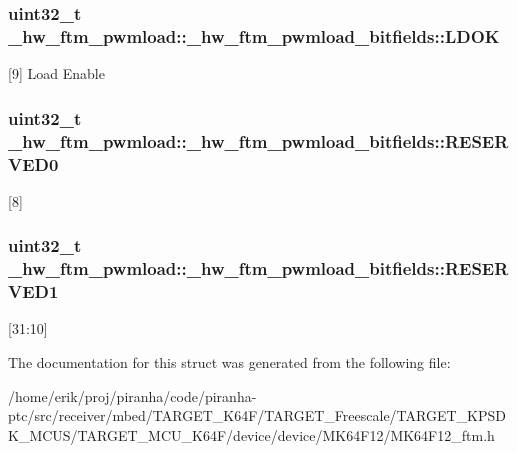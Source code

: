 \subsubsection[{\texorpdfstring{L\+D\+OK}{LDOK}}]{\setlength{\rightskip}{0pt plus 5cm}uint32\+\_\+t \+\_\+hw\+\_\+ftm\+\_\+pwmload\+::\+\_\+hw\+\_\+ftm\+\_\+pwmload\+\_\+bitfields\+::\+L\+D\+OK}\hypertarget{struct__hw__ftm__pwmload_1_1__hw__ftm__pwmload__bitfields_a13b04d6840087207cdf0e60ef3ca5700}{}\label{struct__hw__ftm__pwmload_1_1__hw__ftm__pwmload__bitfields_a13b04d6840087207cdf0e60ef3ca5700}
\mbox{[}9\mbox{]} Load Enable 
\subsubsection[{\texorpdfstring{R\+E\+S\+E\+R\+V\+E\+D0}{RESERVED0}}]{\setlength{\rightskip}{0pt plus 5cm}uint32\+\_\+t \+\_\+hw\+\_\+ftm\+\_\+pwmload\+::\+\_\+hw\+\_\+ftm\+\_\+pwmload\+\_\+bitfields\+::\+R\+E\+S\+E\+R\+V\+E\+D0}\hypertarget{struct__hw__ftm__pwmload_1_1__hw__ftm__pwmload__bitfields_ab28058e83a7216ff12414fef308c0da1}{}\label{struct__hw__ftm__pwmload_1_1__hw__ftm__pwmload__bitfields_ab28058e83a7216ff12414fef308c0da1}
\mbox{[}8\mbox{]} 
\subsubsection[{\texorpdfstring{R\+E\+S\+E\+R\+V\+E\+D1}{RESERVED1}}]{\setlength{\rightskip}{0pt plus 5cm}uint32\+\_\+t \+\_\+hw\+\_\+ftm\+\_\+pwmload\+::\+\_\+hw\+\_\+ftm\+\_\+pwmload\+\_\+bitfields\+::\+R\+E\+S\+E\+R\+V\+E\+D1}\hypertarget{struct__hw__ftm__pwmload_1_1__hw__ftm__pwmload__bitfields_af413226bc6202ec273c9a66e6910367a}{}\label{struct__hw__ftm__pwmload_1_1__hw__ftm__pwmload__bitfields_af413226bc6202ec273c9a66e6910367a}
\mbox{[}31\+:10\mbox{]} 

The documentation for this struct was generated from the following file\+:\begin{DoxyCompactItemize}
\item 
/home/erik/proj/piranha/code/piranha-\/ptc/src/receiver/mbed/\+T\+A\+R\+G\+E\+T\+\_\+\+K64\+F/\+T\+A\+R\+G\+E\+T\+\_\+\+Freescale/\+T\+A\+R\+G\+E\+T\+\_\+\+K\+P\+S\+D\+K\+\_\+\+M\+C\+U\+S/\+T\+A\+R\+G\+E\+T\+\_\+\+M\+C\+U\+\_\+\+K64\+F/device/device/\+M\+K64\+F12/M\+K64\+F12\+\_\+ftm.\+h\end{DoxyCompactItemize}
